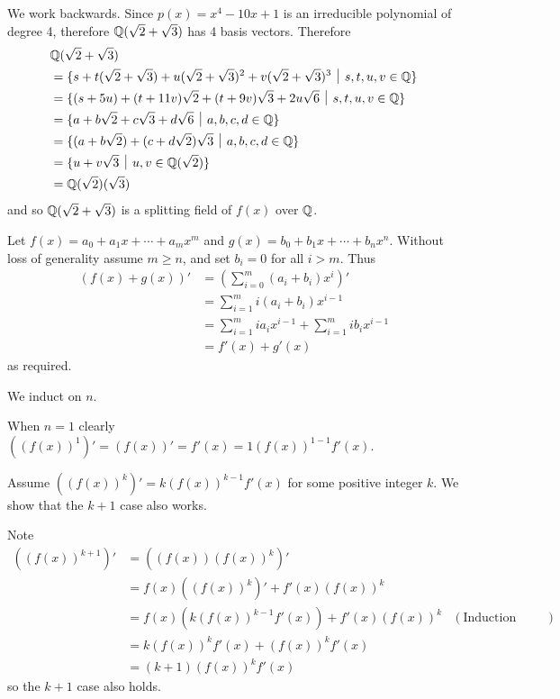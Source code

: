 \begin{questions}
\begin{partquestions}{\roman*}
        \item We work backwards. Since $p(x) = x^4 - 10x + 1$ is an irreducible polynomial of degree 4, therefore $\mathbb{Q}(\sqrt2 + \sqrt3)$ has 4 basis vectors. Therefore
        \begin{align*}
            &\Q(\sqrt2 + \sqrt3)\\
            &= \{s + t(\sqrt2 + \sqrt3) + u(\sqrt2 + \sqrt3)^2 + v(\sqrt2 + \sqrt3)^3 \vert s,t,u,v \in \Q\}\\
            &= \{(s + 5u) + (t + 11v)\sqrt2 + (t + 9v)\sqrt3 + 2u\sqrt6 \vert s, t, u, v \in \Q\}\\
            &= \{a + b\sqrt2 + c\sqrt3 + d\sqrt6 \vert a, b, c, d \in \Q\}\\
            &=\{(a+b\sqrt2) + (c+d\sqrt2)\sqrt3 \vert a, b, c, d \in \Q\}\\
            &=\{u + v\sqrt3 \vert u, v \in \Q(\sqrt2)\}\\
            &= \Q(\sqrt2)(\sqrt3)
        \end{align*}
        and so $\mathbb{Q}(\sqrt2 + \sqrt3)$ is a splitting field of $f(x)$ over $\mathbb{Q}$.
    \end{partquestions}

    \item Let $f(x) = a_0 + a_1x + \cdots + a_mx^m$ and $g(x) = b_0 + b_1x + \cdots + b_nx^n$. Without loss of generality assume $m \geq n$, and set $b_i = 0$ for all $i > m$. Thus
    \begin{align*}
        (f(x) + g(x))' &= \left(\sum_{i=0}^m(a_i + b_i)x^i\right)'\\
        &= \sum_{i=1}^m i(a_i+b_i)x^{i-1}\\
        &= \sum_{i=1}^m ia_ix^{i-1} + \sum_{i=1}^m ib_ix^{i-1}\\
        &= f'(x) + g'(x)
    \end{align*}
    as required.

    \item We induct on $n$.

    When $n = 1$ clearly $((f(x))^1)' = (f(x))' = f'(x) = 1(f(x))^{1-1}f'(x)$.

    Assume $((f(x))^k)' = k(f(x))^{k-1}f'(x)$ for some positive integer $k$. We show that the $k+1$ case also works.

    Note
    \begin{align*}
        ((f(x))^{k+1})' &= ((f(x))(f(x))^k)'\\
        &= f(x)((f(x))^k)' + f'(x)(f(x))^k\\
        &= f(x)(k(f(x))^{k-1}f'(x)) + f'(x)(f(x))^k & (\text{Induction Hypothesis})\\
        &= k(f(x))^kf'(x) + (f(x))^kf'(x)\\
        &= (k+1)(f(x))^kf'(x)
    \end{align*}
    so the $k+1$ case also holds.


\end{questions}
